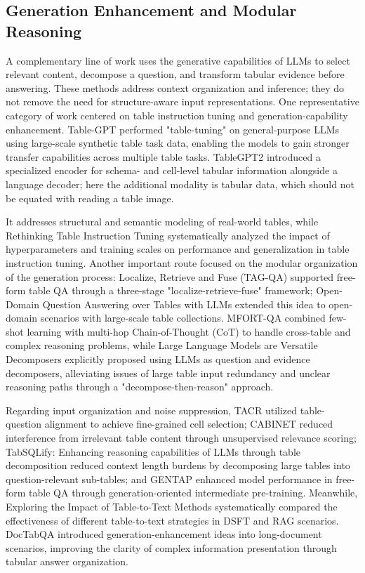 \subsection{Generation Enhancement and Modular Reasoning}
A complementary line of work uses the generative capabilities of LLMs to select relevant content, decompose a question, and transform tabular evidence before answering. These methods address context organization and inference; they do not remove the need for structure-aware input representations. One representative category of work centered on table instruction tuning and generation-capability enhancement. Table-GPT \cite{peng2023table} performed "table-tuning" on general-purpose LLMs using large-scale synthetic table task data, enabling the models to gain stronger transfer capabilities across multiple table tasks. TableGPT2 \cite{su2024tablegpt2} introduced a specialized encoder for schema- and cell-level tabular information alongside a language decoder; here the additional modality is tabular data, which should not be equated with reading a table image.

It addresses structural and semantic modeling of real-world tables, while Rethinking Table Instruction Tuning \cite{deng2025rethinking} systematically analyzed the impact of hyperparameters and training scales on performance and generalization in table instruction tuning. Another important route focused on the modular organization of the generation process: Localize, Retrieve and Fuse (TAG-QA) \cite{zhao2023localize} supported free-form table QA through a three-stage "localize-retrieve-fuse" framework; Open-Domain Question Answering over Tables with LLMs \cite{liang2024open} extended this idea to open-domain scenarios with large-scale table collections. MFORT-QA \cite{guan2024mfort} combined few-shot learning with multi-hop Chain-of-Thought (CoT) to handle cross-table and complex reasoning problems, while Large Language Models are Versatile Decomposers \cite{ye2023large} explicitly proposed using LLMs as question and evidence decomposers, alleviating issues of large table input redundancy and unclear reasoning paths through a "decompose-then-reason" approach.

Regarding input organization and noise suppression, TACR \cite{wu2024table} utilized table-question alignment to achieve fine-grained cell selection; CABINET \cite{patnaik2024cabinet} reduced interference from irrelevant table content through unsupervised relevance scoring; TabSQLify: Enhancing reasoning capabilities of LLMs through table decomposition \cite{nahid2024tabsqlify} reduced context length burdens by decomposing large tables into question-relevant sub-tables; and GENTAP \cite{shi2022generation} enhanced model performance in free-form table QA through generation-oriented intermediate pre-training. Meanwhile, Exploring the Impact of Table-to-Text Methods \cite{min2024exploring} systematically compared the effectiveness of different table-to-text strategies in DSFT and RAG scenarios. DocTabQA \cite{wang2024doctabqa} introduced generation-enhancement ideas into long-document scenarios, improving the clarity of complex information presentation through tabular answer organization.

